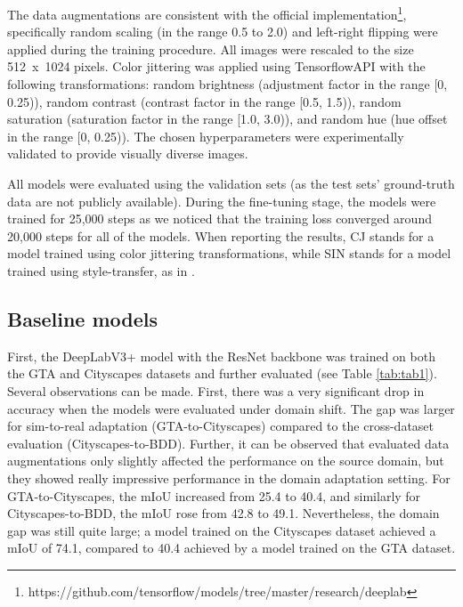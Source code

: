 \documentclass[conference]{IEEEtran}
\begin{document}
The data augmentations are consistent with the official implementation\footnote{https://github.com/tensorflow/models/tree/master/research/deeplab}, specifically random scaling (in the range 0.5 to 2.0) and left-right flipping were applied during the training procedure. All images were rescaled to the size 512 x 1024 pixels. Color jittering was applied using TensorflowAPI with the following transformations: random brightness (adjustment factor in the range [0, 0.25)), random contrast (contrast factor in the range [0.5, 1.5)), random saturation (saturation factor in the range [1.0, 3.0)), and random hue (hue offset in the range [0, 0.25)). The chosen hyperparameters were experimentally validated to provide visually diverse images.

All models were evaluated using the validation sets (as the test sets’ ground-truth data are not publicly available). During the fine-tuning stage, the models were trained for 25,000 steps as we noticed that the training loss converged around 20,000 steps for all of the models. When reporting the results, CJ stands for a model trained using color jittering transformations, while SIN stands for a model trained using style-transfer, as in \cite{cnnbiased}.

\subsection{Baseline models}

First, the DeepLabV3+ model with the ResNet backbone was trained on both the GTA and Cityscapes datasets and further evaluated (see Table \ref{tab:tab1}). Several observations can be made. First, there was a very significant drop in accuracy when the models were evaluated under domain shift. The gap was larger for sim-to-real adaptation (GTA-to-Cityscapes) compared to the cross-dataset evaluation (Cityscapes-to-BDD). Further, it can be observed that evaluated data augmentations only slightly affected the performance on the source domain, but they showed really impressive performance in the domain adaptation setting. For GTA-to-Cityscapes, the mIoU increased from 25.4 to 40.4, and similarly for Cityscapes-to-BDD, the mIoU rose from 42.8 to 49.1. Nevertheless, the domain gap was still quite large; a model trained on the Cityscapes dataset achieved a mIoU of 74.1, compared to 40.4 achieved by a model trained on the GTA dataset.
\end{document}
